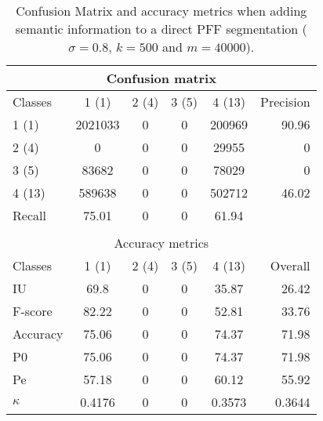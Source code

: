 \begin{table}[H]
\begin{center}
\begin{tabular}{|l|c|c|c|c|r|}
\hline
\multicolumn{6}{|c|}{Confusion matrix} \\
\hline
 Classes & 1 (1) & 2 (4) & 3 (5) & 4 (13) & Precision \\
\hline
1 (1) & 2021033 & 0 & 0 & 200969 & 90.96 \\
\hline
2 (4) & 0 & 0 & 0 & 29955 & 0 \\
\hline
3 (5) & 83682 & 0 & 0 & 78029 & 0 \\
\hline
4 (13) & 589638 & 0 & 0 & 502712 & 46.02 \\
\hline
Recall & 75.01 & 0 & 0 & 61.94 &  \\
\hline
\multicolumn{6}{c}{ } \\
\hline
\multicolumn{6}{|c|}{Accuracy metrics} \\
\hline
 Classes & 1 (1) & 2 (4) & 3 (5) & 4 (13) & Overall \\
\hline
IU & 69.8 & 0 & 0 & 35.87 & 26.42 \\
\hline
F-score & 82.22 & 0 & 0 & 52.81 & 33.76 \\
\hline
Accuracy & 75.06 & 0 & 0 & 74.37 & 71.98 \\
\hline
P0 & 75.06 & 0 & 0 & 74.37 & 71.98 \\
\hline
Pe & 57.18 & 0 & 0 & 60.12 & 55.92 \\
\hline
$\kappa$ & 0.4176 & 0 & 0 & 0.3573 & 0.3644 \\
\hline
\end{tabular}
\caption{Confusion Matrix and accuracy metrics when adding semantic information to a direct PFF segmentation ($\sigma=0.8$, $k=500$ and $m=40000$).}
\label{table:C3_S2_seg_PFF}
\end{center}
\end{table}